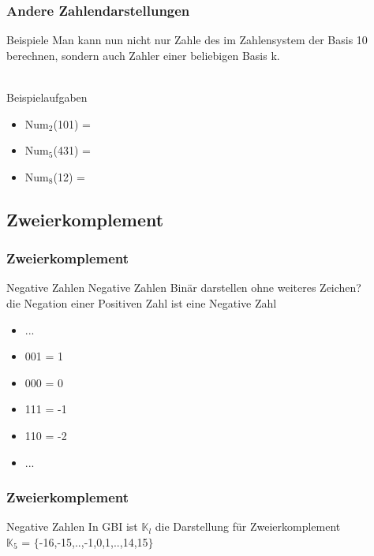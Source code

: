 \documentclass{beamer}
\begin{document}
\begin{frame}
	\frametitle{Andere Zahlendarstellungen}
	\begin{block}{Beispiele}
		Man kann nun nicht nur Zahle des im Zahlensystem der Basis 10 		berechnen, sondern auch Zahler einer beliebigen Basis k.\\
		\hfill\\
		\begin{block}{Beispielaufgaben}
			\begin{itemize}
				\item Num$_{2}$(101) = 
				\item Num$_{5}$(431) = 
				\item Num$_{8}$(12) = 
			\end{itemize}
		\end{block}
	\end{block}
\end{frame}

\subsection{Zweierkomplement}
\begin{frame}
	\frametitle{Zweierkomplement}
	\begin{block}{Negative Zahlen}
		Negative Zahlen Binär darstellen ohne weiteres Zeichen? \\
		die Negation einer Positiven Zahl ist eine Negative Zahl
		
		\begin{itemize}
			\item ...
			\item 001 = 1
			\item 000 = 0
			\item 111 = -1
			\item 110 = -2
			\item ...
		\end{itemize}
	\end{block}
\end{frame}

\begin{frame}
	\frametitle{Zweierkomplement}
	\begin{block}{Negative Zahlen}
		In GBI ist $\mathbb{K}_l$ die Darstellung für 							Zweierkomplement\\
		$\mathbb{K}_5$ = $\{$-16,-15,..,-1,0,1,..,14,15$\}$
	\end{block}
\end{frame}
\end{document}
